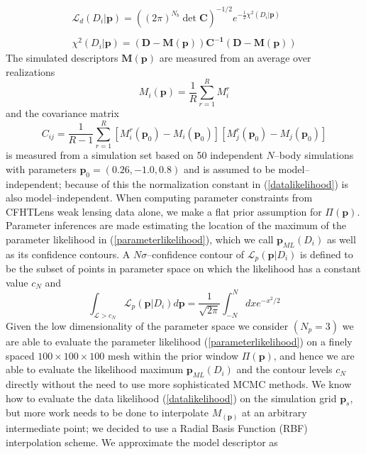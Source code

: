 \documentclass[reprint,aps,prd,superscriptaddress,showkeys]{revtex4-1}
\begin{document}
\begin{equation}
\label{datalikelihood}
\begin{matrix}
\mathcal{L}_d(D_i\vert \mathbf{p}) = ((2\pi)^{N_b}\det{\mathbf{C}})^{-1/2} e^{-\frac{1}{2}\chi^2(D_i\vert \mathbf{p})} \\ \\
\chi^2(D_i\vert \mathbf{p}) = \mathbf{(D - M(p))C^{-1}(D-M(p))}
\end{matrix}
\end{equation} 
%
The simulated descriptors $\mathbf{M(p)}$ are measured from an average over realizations
\begin{equation}
M_i(\mathbf{p}) = \frac{1}{R}\sum_{r=1}^R M_i^r 
\end{equation}
%
and the covariance matrix 
\begin{equation}
\label{datacov}
C_{ij} = \frac{1}{R-1} \sum_{r=1}^R [M_i^r(\mathbf{p}_0)-M_i(\mathbf{p}_0)][M_j^r(\mathbf{p}_0)-M_j(\mathbf{p}_0)]
\end{equation}
%
is measured from a simulation set based on 50 independent $N$--body simulations with parameters $\mathbf{p}_0=(0.26,-1.0,0.8)$ and is assumed to be model--independent; because of this the normalization constant in (\ref{datalikelihood}) is also model--independent. When computing parameter constraints from CFHTLens weak lensing data alone, we make a flat prior assumption for $\Pi(\mathbf{p})$. Parameter inferences are made estimating the location of the maximum of the parameter likelihood in (\ref{parameterlikelihood}), which we call $\mathbf{p}_{ML}(D_i)$ as well as its confidence contours. A $N\sigma$--confidence contour of $\mathcal{L}_p(\mathbf{p}\vert D_i)$ is defined to be the subset of points in parameter space on which the likelihood has a constant value $c_N$ and 
\begin{equation}
\label{ennesigma}
\int_{\mathcal{L}>c_N} \mathcal{L}_p(\mathbf{p}\vert D_i) d\mathbf{p} = \frac{1}{\sqrt{2\pi}}\int_{-N}^N dx e^{-x^2/2}
\end{equation}
%
Given the low dimensionality of the parameter space we consider $(N_p=3)$ we are able to evaluate the parameter likelihood (\ref{parameterlikelihood}) on a finely spaced $100\times100\times100$ mesh within the prior window $\Pi(\mathbf{p})$, and hence we are able to evaluate the likelihood maximum $\mathbf{p}_{ML}(D_i)$ and the contour levels $c_N$ directly without the need to use more sophisticated MCMC methods. We know how to evaluate the data likelihood (\ref{datalikelihood}) on the simulation grid $\mathbf{p}_s$, but more work needs to be done to interpolate $M_(\mathbf{p})$ at an arbitrary intermediate point; we decided to use a Radial Basis Function (RBF) interpolation scheme. We approximate the model descriptor as
\end{document}
